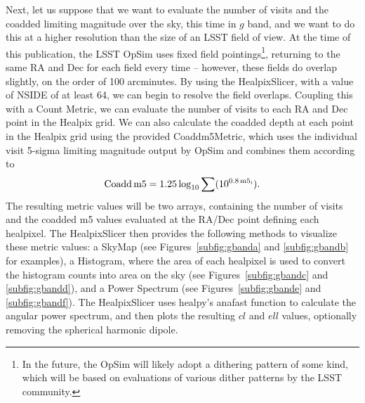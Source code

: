 \documentclass[]{spie}  %
\begin{document}
Next, let us suppose that we want to evaluate the number of visits and
the coadded limiting magnitude over the sky, this time in $g$ band,
and we want to do this at a higher resolution than the size of an LSST
field of view. At the time of this publication, the LSST OpSim uses fixed field
pointings\footnote{In the future, the OpSim will likely adopt a
dithering pattern of some kind, which will be based on evaluations of
various dither patterns by the LSST community.}, returning to the
same RA and Dec for each field every time -- however, these fields do
overlap slightly, on the order of 100 arcminutes. By using the
HealpixSlicer, with a value of NSIDE of at least 64, we can begin to
resolve the field overlaps.  Coupling this with a Count Metric, we can evaluate
the number of visits to each RA and Dec point in the Healpix grid. We
can also calculate the coadded depth at each point in the Healpix grid
using the provided Coaddm5Metric, which uses the individual visit
5-sigma limiting magnitude output by OpSim and combines them according
to
\begin{equation}
\rm{Coadd\, m5} = 1.25 \log_{10} \sum ( 10^{0.8 \,\rm{m5_i}} ).
\end{equation}
The resulting metric values will be two arrays, containing the number of visits and the
coadded m5 values evaluated at the RA/Dec point defining each
healpixel. The HealpixSlicer then provides the following methods to
visualize these metric values: a SkyMap (see
Figures~\ref{subfig:gbanda} and \ref{subfig:gbandb} for examples), a Histogram, where the area of each healpixel
is used to convert the histogram counts into area on the sky (see
Figures~\ref{subfig:gbandc} and \ref{subfig:gbandd}), and a Power Spectrum (see
Figures~\ref{subfig:gbande} and \ref{subfig:gbandf}). The HealpixSlicer uses
healpy's anafast function to calculate the angular power spectrum, and
then plots the resulting $cl$ and $ell$ values, optionally removing
the spherical harmonic dipole. 
\end{document}
